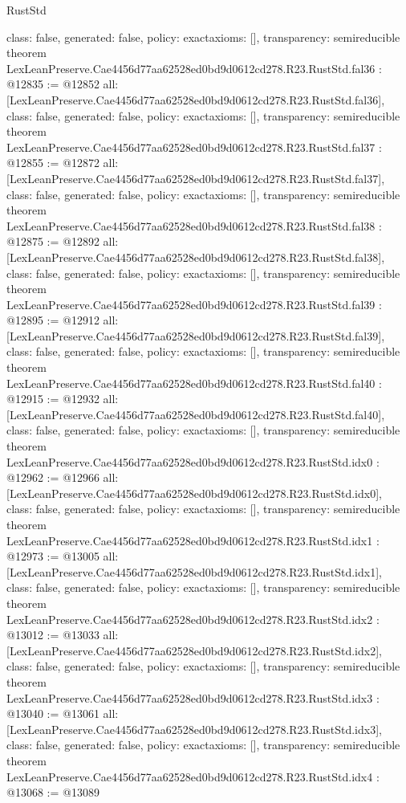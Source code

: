 \begin{lexlean}{RustStd}
\begin{coremodule}
{  class: false,
  generated: false,
  policy: exact{axioms: []},
  transparency: semireducible
}
theorem LexLeanPreserve.Cae4456d77aa62528ed0bd9d0612cd278.R23.RustStd.fal36 : @12835 := @12852 {
  all: [LexLeanPreserve.Cae4456d77aa62528ed0bd9d0612cd278.R23.RustStd.fal36],
  class: false,
  generated: false,
  policy: exact{axioms: []},
  transparency: semireducible
}
theorem LexLeanPreserve.Cae4456d77aa62528ed0bd9d0612cd278.R23.RustStd.fal37 : @12855 := @12872 {
  all: [LexLeanPreserve.Cae4456d77aa62528ed0bd9d0612cd278.R23.RustStd.fal37],
  class: false,
  generated: false,
  policy: exact{axioms: []},
  transparency: semireducible
}
theorem LexLeanPreserve.Cae4456d77aa62528ed0bd9d0612cd278.R23.RustStd.fal38 : @12875 := @12892 {
  all: [LexLeanPreserve.Cae4456d77aa62528ed0bd9d0612cd278.R23.RustStd.fal38],
  class: false,
  generated: false,
  policy: exact{axioms: []},
  transparency: semireducible
}
theorem LexLeanPreserve.Cae4456d77aa62528ed0bd9d0612cd278.R23.RustStd.fal39 : @12895 := @12912 {
  all: [LexLeanPreserve.Cae4456d77aa62528ed0bd9d0612cd278.R23.RustStd.fal39],
  class: false,
  generated: false,
  policy: exact{axioms: []},
  transparency: semireducible
}
theorem LexLeanPreserve.Cae4456d77aa62528ed0bd9d0612cd278.R23.RustStd.fal40 : @12915 := @12932 {
  all: [LexLeanPreserve.Cae4456d77aa62528ed0bd9d0612cd278.R23.RustStd.fal40],
  class: false,
  generated: false,
  policy: exact{axioms: []},
  transparency: semireducible
}
theorem LexLeanPreserve.Cae4456d77aa62528ed0bd9d0612cd278.R23.RustStd.idx0 : @12962 := @12966 {
  all: [LexLeanPreserve.Cae4456d77aa62528ed0bd9d0612cd278.R23.RustStd.idx0],
  class: false,
  generated: false,
  policy: exact{axioms: []},
  transparency: semireducible
}
theorem LexLeanPreserve.Cae4456d77aa62528ed0bd9d0612cd278.R23.RustStd.idx1 : @12973 := @13005 {
  all: [LexLeanPreserve.Cae4456d77aa62528ed0bd9d0612cd278.R23.RustStd.idx1],
  class: false,
  generated: false,
  policy: exact{axioms: []},
  transparency: semireducible
}
theorem LexLeanPreserve.Cae4456d77aa62528ed0bd9d0612cd278.R23.RustStd.idx2 : @13012 := @13033 {
  all: [LexLeanPreserve.Cae4456d77aa62528ed0bd9d0612cd278.R23.RustStd.idx2],
  class: false,
  generated: false,
  policy: exact{axioms: []},
  transparency: semireducible
}
theorem LexLeanPreserve.Cae4456d77aa62528ed0bd9d0612cd278.R23.RustStd.idx3 : @13040 := @13061 {
  all: [LexLeanPreserve.Cae4456d77aa62528ed0bd9d0612cd278.R23.RustStd.idx3],
  class: false,
  generated: false,
  policy: exact{axioms: []},
  transparency: semireducible
}
theorem LexLeanPreserve.Cae4456d77aa62528ed0bd9d0612cd278.R23.RustStd.idx4 : @13068 := @13089 {
}
\end{coremodule}
\end{lexlean}

